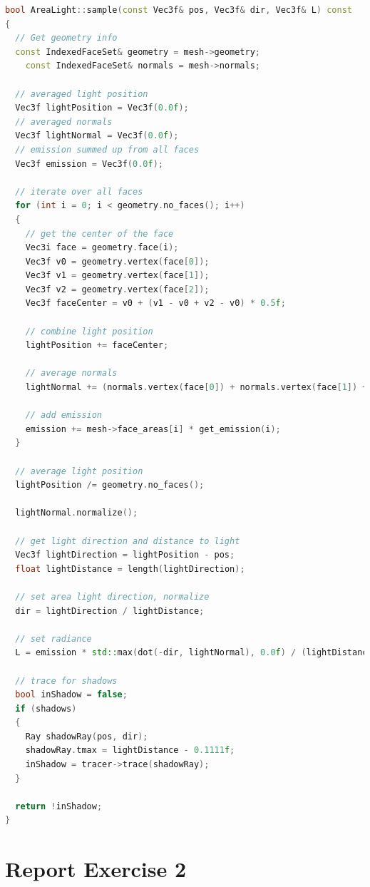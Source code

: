 \documentclass[a4paper]{article}
\begin{document}
\begin{lstlisting}[language=C++,caption=AreaLight.cpp,label=lst:arealight]
bool AreaLight::sample(const Vec3f& pos, Vec3f& dir, Vec3f& L) const
{  
  // Get geometry info
  const IndexedFaceSet& geometry = mesh->geometry;
	const IndexedFaceSet& normals = mesh->normals;

  // averaged light position
  Vec3f lightPosition = Vec3f(0.0f);
  // averaged normals
  Vec3f lightNormal = Vec3f(0.0f);
  // emission summed up from all faces
  Vec3f emission = Vec3f(0.0f);

  // iterate over all faces
  for (int i = 0; i < geometry.no_faces(); i++)
  {
    // get the center of the face
    Vec3i face = geometry.face(i);
    Vec3f v0 = geometry.vertex(face[0]);
    Vec3f v1 = geometry.vertex(face[1]);
    Vec3f v2 = geometry.vertex(face[2]);
    Vec3f faceCenter = v0 + (v1 - v0 + v2 - v0) * 0.5f;
    
    // combine light position
    lightPosition += faceCenter;

    // average normals
    lightNormal += (normals.vertex(face[0]) + normals.vertex(face[1]) + normals.vertex(face[2])) / 3;

    // add emission
    emission += mesh->face_areas[i] * get_emission(i);
  }

  // average light position
  lightPosition /= geometry.no_faces();

  lightNormal.normalize();
  
  // get light direction and distance to light
  Vec3f lightDirection = lightPosition - pos;
  float lightDistance = length(lightDirection);

  // set area light direction, normalize
  dir = lightDirection / lightDistance;

  // set radiance
  L = emission * std::max(dot(-dir, lightNormal), 0.0f) / (lightDistance * lightDistance);

  // trace for shadows
  bool inShadow = false;
  if (shadows)
  {
    Ray shadowRay(pos, dir);
    shadowRay.tmax = lightDistance - 0.1111f;
    inShadow = tracer->trace(shadowRay);
  }

  return !inShadow;
}
\end{lstlisting}

\newpage
\section{Report Exercise 2}
\end{document}
